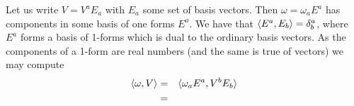Let us write $V=V^a E_a$ with $E_a$ some set of basis vectors. Then $\omega= \omega_a E^a$ has components in some basis of one forms $E^a$. We have that $\langle E^a, E_b\rangle=\delta^a_b$, where $E^a$ forms a basis of 1-forms which is dual to the ordinary basis vectors. As the components of a 1-form are real numbers (and the same is true of vectors) we may compute
\begin{eqnarray*}
\langle\omega,V\rangle&=&\langle\omega_a E^a, V^b E_b\rangle\\
&=&
\end{eqnarray*}